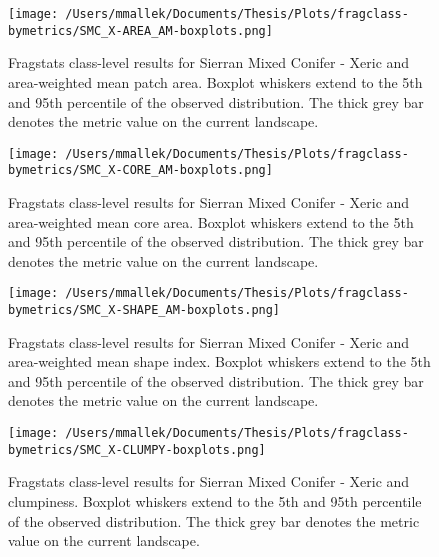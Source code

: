 \begin{figure}[!htbp]
\centering
    \texttt{[image: /Users/mmallek/Documents/Thesis/Plots/fragclass-bymetrics/SMC\_X-AREA\_AM-boxplots.png]}
  \caption{Fragstats class-level results for Sierran Mixed Conifer - Xeric and area-weighted mean patch area. Boxplot whiskers extend to the 5th and 95th percentile of the observed distribution. The thick grey bar denotes the metric value on the current landscape.}
  \label{fig:smcx_areaam}
\end{figure}


\begin{figure}[!htbp]
\centering
    \texttt{[image: /Users/mmallek/Documents/Thesis/Plots/fragclass-bymetrics/SMC\_X-CORE\_AM-boxplots.png]}
  \caption{Fragstats class-level results for Sierran Mixed Conifer - Xeric and area-weighted mean core area. Boxplot whiskers extend to the 5th and 95th percentile of the observed distribution. The thick grey bar denotes the metric value on the current landscape.}
  \label{fig:smcx_coream}
\end{figure}


\begin{figure}[!htbp]
\centering
    \texttt{[image: /Users/mmallek/Documents/Thesis/Plots/fragclass-bymetrics/SMC\_X-SHAPE\_AM-boxplots.png]}
  \caption{Fragstats class-level results for Sierran Mixed Conifer - Xeric and area-weighted mean shape index. Boxplot whiskers extend to the 5th and 95th percentile of the observed distribution. The thick grey bar denotes the metric value on the current landscape.}
  \label{fig:smcx_shapeam}
\end{figure}


\begin{figure}[!htbp]
\centering
    \texttt{[image: /Users/mmallek/Documents/Thesis/Plots/fragclass-bymetrics/SMC\_X-CLUMPY-boxplots.png]}
  \caption{Fragstats class-level results for Sierran Mixed Conifer - Xeric and clumpiness. Boxplot whiskers extend to the 5th and 95th percentile of the observed distribution. The thick grey bar denotes the metric value on the current landscape.}
  \label{fig:smcx_clumpy}
\end{figure}
